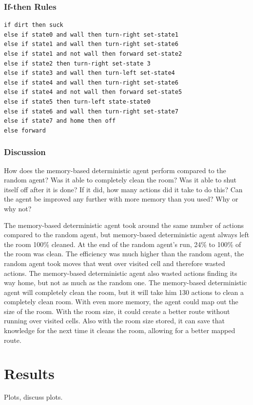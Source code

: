 \documentclass[a4paper,10pt]{article}
\begin{document}
\subsubsection{If-then Rules}
\begin{verbatim}
if dirt then suck
else if state0 and wall then turn-right set-state1
else if state1 and wall then turn-right set-state6
else if state1 and not wall then forward set-state2
else if state2 then turn-right set-state 3
else if state3 and wall then turn-left set-state4
else if state4 and wall then turn-right set-state6
else if state4 and not wall then forward set-state5
else if state5 then turn-left state-state0
else if state6 and wall then turn-right set-state7
else if state7 and home then off
else forward
\end{verbatim}

\subsubsection{Discussion}
How does the memory-based deterministic agent perform compared to the random agent? Was it able to completely clean the room? Was it able to shut itself off after it is done? If it did, how many actions did it take to do this? Can the agent be improved any further with more memory than you used? Why or why not?

The memory-based deterministic agent took around the same number of actions compared to the random agent, but memory-based deterministic agent always left the room 100\% cleaned.
At the end of the random agent's run, 24\% to 100\% of the room was clean.
The efficiency was much higher than the random agent, the random agent took moves that went over visited cell and therefore wasted actions.
The memory-based deterministic agent also wasted actions finding its way home, but not as much as the random one.
The memory-based deterministic agent will completely clean the room, but it will take him 130 actions to clean a completely clean room.
With even more memory, the agent could map out the size of the room.
With the room size, it could create a better route without running over visited cells.
Also with the room size stored, it can save that knowledge for the next time it cleans the room, allowing for a better mapped route.


\section{Results}
Plots, discuss plots.
\end{document}
